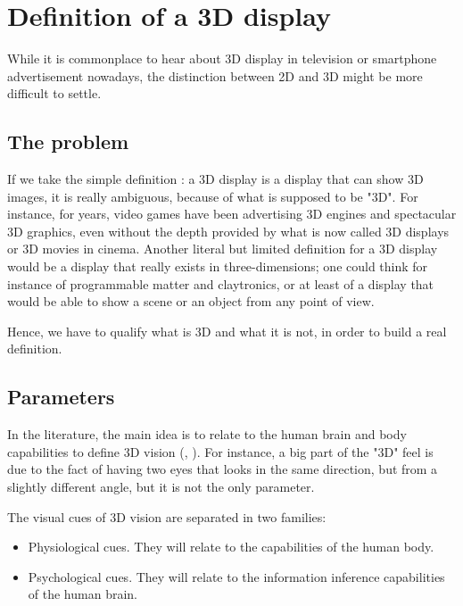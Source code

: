 \section{Definition of a 3D display}
While it is commonplace to hear about 3D display in television or smartphone advertisement nowadays, the distinction between 2D and 3D might be more difficult to settle.
\subsection{The problem}
If we take the simple definition : a 3D display is a display that can show 3D images, it is really ambiguous, because of what is supposed to be "3D". For instance, for years, video games have been advertising 3D engines and spectacular 3D graphics, even without the depth provided by what is now called 3D displays or 3D movies in cinema.
Another literal but limited definition for a 3D display would be a display that really exists in three-dimensions; one could think for instance of programmable matter and claytronics, or at least of a display that would be able to show a scene or an object from any point of view.

Hence, we have to qualify what is 3D and what it is not, in order to build a real definition.

\subsection{Parameters}
In the literature, the main idea is to relate to the human brain and body capabilities to define 3D vision (\cite{okoshi1976three}, \cite{pimenta2012comprehensive}). For instance, a big part of the "3D" feel is due to the fact of having two eyes that looks in the same direction, but from a slightly different angle, but it is not the only parameter.

The visual cues of 3D vision are separated in two families:  
\begin{itemize}
\item Physiological cues. They will relate to the capabilities of the human body.
\item Psychological cues. They will relate to the information inference capabilities of the human brain.
\end{itemize}

